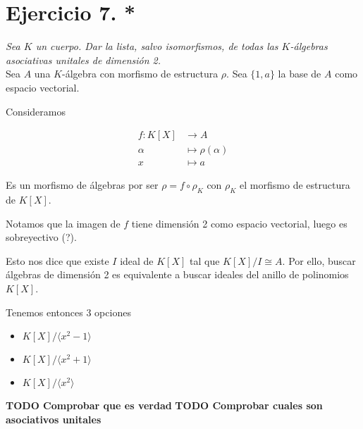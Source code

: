 \section{Ejercicio 7. *} \emph{Sea \(K\) un cuerpo. Dar la lista, salvo isomorfismos, de
todas las \(K\)-álgebras asociativas unitales de dimensión 2.}\\

Sea \(A\) una \(K\)-álgebra con morfismo de estructura \(\rho\). Sea \(\{1,
a\}\) la base de \(A\) como espacio vectorial.


Consideramos

\[
  \begin{aligned}
    f:K[X] &\to A \\
    \alpha &\mapsto \rho(\alpha)\\
    x &\mapsto a
  \end{aligned}
\]

Es un morfismo de álgebras por ser \(\rho = f \circ \rho_K\) con \(\rho_K\) el
morfismo de estructura de \(K[X]\).

Notamos que la imagen de \(f\) tiene dimensión 2 como espacio vectorial, luego
es sobreyectivo (?).

Esto nos dice que existe \(I\) ideal de \(K[X]\) tal que \(K[X]/I \cong A\). Por
ello, buscar álgebras de dimensión 2 es equivalente a buscar ideales del anillo
de polinomios \(K[X]\).

Tenemos entonces 3 opciones
\begin{itemize}
\item \(K[X]/\langle x^2-1 \rangle\)
\item \(K[X]/\langle x^2+1\rangle\)
\item \(K[X]/\langle x^2\rangle\)
\end{itemize}

\textbf{TODO Comprobar que es verdad}
\textbf{TODO Comprobar cuales son asociativos unitales}
